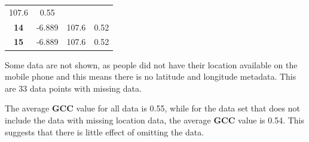 \documentclass[]{elsarticle} %
\begin{document}
\begin{longtable}[]{@{}cccc@{}}
\begin{minipage}[t]{0.15\columnwidth}
107.6\strut
\end{minipage} & \begin{minipage}[t]{0.07\columnwidth}\centering\strut
0.55\strut
\end{minipage}\tabularnewline
\begin{minipage}[t]{0.11\columnwidth}\centering\strut
\textbf{14}\strut
\end{minipage} & \begin{minipage}[t]{0.14\columnwidth}\centering\strut
-6.889\strut
\end{minipage} & \begin{minipage}[t]{0.15\columnwidth}\centering\strut
107.6\strut
\end{minipage} & \begin{minipage}[t]{0.07\columnwidth}\centering\strut
0.52\strut
\end{minipage}\tabularnewline
\begin{minipage}[t]{0.11\columnwidth}\centering\strut
\textbf{15}\strut
\end{minipage} & \begin{minipage}[t]{0.14\columnwidth}\centering\strut
-6.889\strut
\end{minipage} & \begin{minipage}[t]{0.15\columnwidth}\centering\strut
107.6\strut
\end{minipage} & \begin{minipage}[t]{0.07\columnwidth}\centering\strut
0.52\strut
\end{minipage}\tabularnewline
\bottomrule
\end{longtable}

Some data are not shown, as people did not have their location available
on the mobile phone and this means there is no latitude and longitude
metadata. This are 33 data points with missing data.

The average \textbf{GCC} value for all data is 0.55, while for the data
set that does not include the data with missing location data, the
average \textbf{GCC} value is 0.54. This suggests that there is little
effect of omitting the data.
\end{document}
